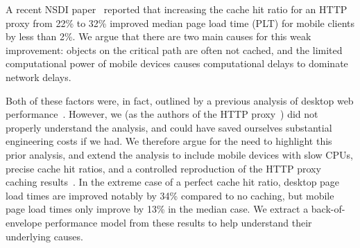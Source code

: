 A recent NSDI paper~\cite{flywheel} reported that
increasing the cache hit ratio for an HTTP proxy from 22\% to 32\% improved
median page load time (PLT) for mobile clients by less than 2\%.
We argue that there are two main causes for this weak improvement:
objects on the critical path are often not cached, and the limited computational power of mobile devices causes computational delays to dominate network delays. %

Both of
these factors were, in fact, outlined by a previous analysis of desktop
web performance~\cite{wang2013demystifying}. However, we (as the authors of the HTTP proxy~\cite{flywheel}) did not properly understand the analysis, and could have saved ourselves substantial engineering costs if we had. We therefore argue for the need to highlight this prior
analysis, and extend the analysis
to include mobile devices with slow CPUs, precise cache hit ratios,
and a controlled reproduction of the
HTTP proxy caching
results~\cite{flywheel}. %
In the extreme case of a perfect cache hit ratio, desktop page load times are
improved notably by 34\% compared to no caching, but mobile page
load times only improve by 13\% in the median case.
We extract a back-of-envelope performance model from these results to
help understand their underlying causes.




